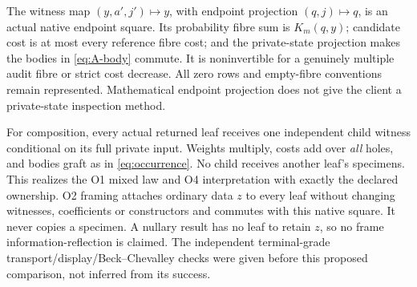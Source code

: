 \documentclass[11pt,a4paper]{article}
\theoremstyle{definition}
\begin{document}
The witness map $(y,a',j')\mapsto y$, with endpoint projection
$(q,j)\mapsto q$, is an actual native endpoint square. Its probability
fibre sum is $K_m(q,y)$; candidate cost is at most every reference fibre
cost; and the private-state projection makes the bodies in
\eqref{eq:A-body} commute. It is noninvertible for a genuinely multiple
audit fibre or strict cost decrease. All zero rows and empty-fibre
conventions remain represented. Mathematical endpoint projection does
not give the client a private-state inspection method.

For composition, every actual returned leaf receives one independent
child witness conditional on its full private input. Weights multiply,
costs add over \emph{all} holes, and bodies graft as in
\eqref{eq:occurrence}. No child receives another leaf's specimens.
This realizes the O1 mixed law and O4 interpretation with exactly the
declared ownership. O2 framing attaches ordinary data $z$ to every leaf
without changing witnesses, coefficients or constructors and commutes
with this native square. It never copies a specimen. A nullary result
has no leaf to retain $z$, so no frame information-reflection is claimed.
The independent terminal-grade transport/display/Beck--Chevalley checks
were given before this proposed comparison, not inferred from its success.
\end{document}
